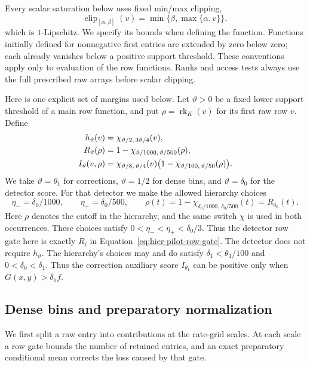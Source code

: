 Every scalar saturation below uses fixed min/max clipping,
\[
 \operatorname{clip}_{[\alpha,\beta]}(v)
   =\min\{\beta,\max\{\alpha,v\}\},
\]
which is $1$-Lipschitz.  We specify its bounds when defining the function.
Functions initially defined for nonnegative first entries are extended
by zero below zero; each already vanishes below a positive support
threshold.  These conventions apply only to evaluation of the row
functions.  Ranks and access tests always use the full prescribed raw
arrays before scalar clipping.

Here is one explicit set of margins used below.  Let $\vartheta>0$ be a
fixed lower support threshold of a main row function, and put
$\rho=\operatorname{rk}_K(v)$ for its first raw row $v$.  Define
\begin{align}
 h_{\vartheta}(v)
   &=\chi_{\vartheta/2,\,3\vartheta/4}(v),\notag\\
 R_{\vartheta}(\rho)
   &=1-\chi_{\vartheta/1000,\,\vartheta/500}(\rho),\notag\\
 I_{\vartheta}(v,\rho)
   &=\chi_{\vartheta/8,\,\vartheta/4}(v)
       \bigl(1-\chi_{\vartheta/100,\,\vartheta/50}(\rho)\bigr).
 \label{eq:atom-threshold-template}
\end{align}
We take $\vartheta=\theta_1$ for corrections, $\vartheta=1/2$ for dense
bins, and $\vartheta=\delta_0$ for the detector score.  For that detector
we make the allowed hierarchy choices
\[
 \eta_-=\delta_0/1000,\qquad \eta_+=\delta_0/500,\qquad
 \rho(t)=1-\chi_{\delta_0/1000,\,\delta_0/500}(t)
          =R_{\delta_0}(t).
\]
Here $\rho$ denotes the cutoff in the hierarchy, and the same switch
$\chi$ is used in both occurrences.  These choices satisfy
$0<\eta_-<\eta_+<\delta_0/3$.  Thus the detector row gate here is exactly
$R_i$ in Equation~\eqref{eq:hier-pilot-row-gate}.
The detector does not require $h_{\vartheta}$.
The hierarchy's choices may and do satisfy
$\delta_1<\theta_1/100$ and $0<\delta_0<\delta_1$.
Thus the correction auxiliary score $I_{\theta_1}$ can be positive only
when $G(x,y)>\delta_1 f$.

\subsection{Dense bins and preparatory normalization}

We first split a raw entry into contributions at the rate-grid scales.
At each scale a row gate bounds the number of retained entries, and an
exact preparatory conditional mean corrects the loss caused by that gate.

